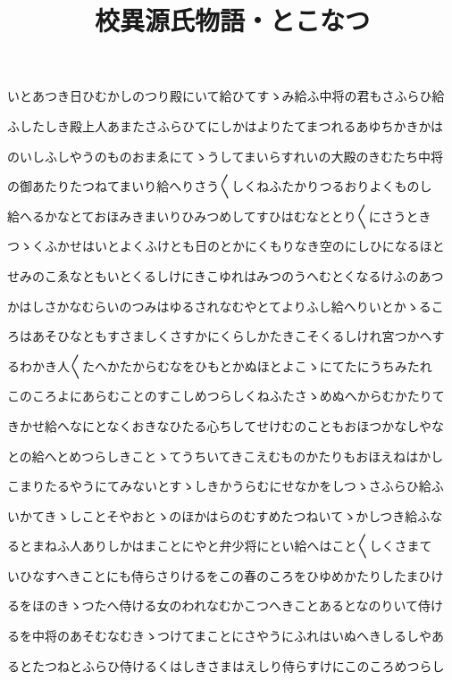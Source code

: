 \documentclass[a4paper,11pt,landscape]{ltjtarticle}
\title{校異源氏物語・とこなつ}
\date{}
\begin{document}
\maketitle

いとあつき日ひむかしのつり殿にいて給ひてすゝみ給ふ中将の君もさふらひ給
\par\medskip
ふしたしき殿上人あまたさふらひてにしかはよりたてまつれるあゆちかきかは
\par\medskip
のいしふしやうのものおまゑにてゝうしてまいらすれいの大殿のきむたち中将
\par\medskip
の御あたりたつねてまいり給へりさう〱しくねふたかりつるおりよくものし
\par\medskip
給へるかなとておほみきまいりひみつめしてすひはむなととり〱にさうとき
\par\medskip
つゝくふかせはいとよくふけとも日のとかにくもりなき空のにしひになるほと
\par\medskip
せみのこゑなともいとくるしけにきこゆれはみつのうへむとくなるけふのあつ
\par\medskip
かはしさかなむらいのつみはゆるされなむやとてよりふし給へりいとかゝるこ
\par\medskip
ろはあそひなともすさましくさすかにくらしかたきこそくるしけれ宮つかへす
\par\medskip
るわかき人〱たへかたからむなをひもとかぬほとよこゝにてたにうちみたれ
\par\medskip
このころよにあらむことのすこしめつらしくねふたさゝめぬへからむかたりて
\par\medskip
きかせ給へなにとなくおきなひたる心ちしてせけむのこともおほつかなしやな
\par\medskip
との給へとめつらしきことゝてうちいてきこえむものかたりもおほえねはかし
\par\medskip
こまりたるやうにてみないとすゝしきかうらむにせなかをしつゝさふらひ給ふ
\par\medskip
いかてきゝしことそやおとゝのほかはらのむすめたつねいてゝかしつき給ふな
\par\medskip
るとまねふ人ありしかはまことにやと弁少将にとい給へはこと〱しくさまて
\par\medskip
いひなすへきことにも侍らさりけるをこの春のころをひゆめかたりしたまひけ
\par\medskip
るをほのきゝつたへ侍ける女のわれなむかこつへきことあるとなのりいて侍け
\par\medskip
るを中将のあそむなむきゝつけてまことにさやうにふれはいぬへきしるしやあ
\par\medskip
るとたつねとふらひ侍けるくはしきさまはえしり侍らすけにこのころめつらし
\end{document}
